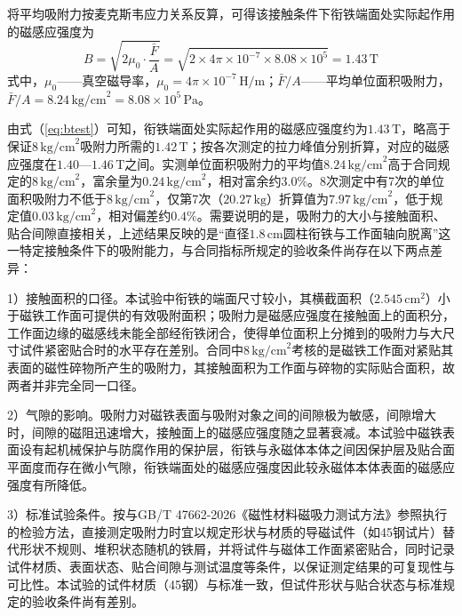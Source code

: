 将平均吸附力按麦克斯韦应力关系反算，可得该接触条件下衔铁端面处实际起作用的磁感应强度为
\begin{equation}
	B=\sqrt{2\mu_0\cdot\frac{\bar F}{A}}=\sqrt{2\times 4\pi\times 10^{-7}\times 8.08\times 10^{5}}=1.43\,\text{T}
	\label{eq:btest}
\end{equation}
式中，$\mu_0$——真空磁导率，$\mu_0=4\pi\times 10^{-7}\,\text{H/m}$；$\bar F/A$——平均单位面积吸附力，$\bar F/A=8.24\,\text{kg/cm}^2=8.08\times 10^{5}\,\text{Pa}$。

由式（\ref{eq:btest}）可知，衔铁端面处实际起作用的磁感应强度约为$1.43\,\text{T}$，略高于保证$8\,\text{kg/cm}^2$吸附力所需的$1.42\,\text{T}$；按各次测定的拉力峰值分别折算，对应的磁感应强度在$1.40$—$1.46\,\text{T}$之间。实测单位面积吸附力的平均值$8.24\,\text{kg/cm}^2$高于合同规定的$8\,\text{kg/cm}^2$，富余量为$0.24\,\text{kg/cm}^2$，相对富余约$3.0\%$。8次测定中有7次的单位面积吸附力不低于$8\,\text{kg/cm}^2$，仅第7次（$20.27\,\text{kg}$）折算值为$7.97\,\text{kg/cm}^2$，低于规定值$0.03\,\text{kg/cm}^2$，相对偏差约$0.4\%$。需要说明的是，吸附力的大小与接触面积、贴合间隙直接相关，上述结果反映的是“直径$1.8\,\text{cm}$圆柱衔铁与工作面轴向脱离”这一特定接触条件下的吸附能力，与合同指标所规定的验收条件尚存在以下两点差异：

1）接触面积的口径。本试验中衔铁的端面尺寸较小，其横截面积（$2.545\,\text{cm}^2$）小于磁铁工作面可提供的有效吸附面积；吸附力是磁感应强度在接触面上的面积分，工作面边缘的磁感线未能全部经衔铁闭合，使得单位面积上分摊到的吸附力与大尺寸试件紧密贴合时的水平存在差别。合同中$8\,\text{kg/cm}^2$考核的是磁铁工作面对紧贴其表面的磁性碎物所产生的吸附力，其接触面积为工作面与碎物的实际贴合面积，故两者并非完全同一口径。

2）气隙的影响。吸附力对磁铁表面与吸附对象之间的间隙极为敏感，间隙增大时，间隙的磁阻迅速增大，接触面上的磁感应强度随之显著衰减。本试验中磁铁表面设有起机械保护与防腐作用的保护层，衔铁与永磁体本体之间因保护层及贴合面平面度而存在微小气隙，衔铁端面处的磁感应强度因此较永磁体本体表面的磁感应强度有所降低。

3）标准试验条件。按与GB/T 47662-2026《磁性材料磁吸力测试方法》参照执行的检验方法，直接测定吸附力时宜以规定形状与材质的导磁试件（如45钢试片）替代形状不规则、堆积状态随机的铁屑，并将试件与磁体工作面紧密贴合，同时记录试件材质、表面状态、贴合间隙与测试温度等条件，以保证测定结果的可复现性与可比性。本试验的试件材质（45钢）与标准一致，但试件形状与贴合状态与标准规定的验收条件尚有差别。


